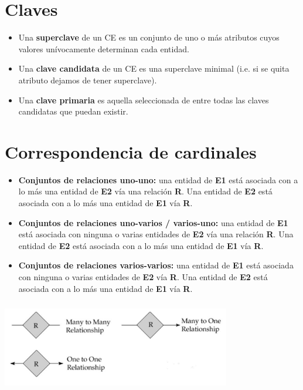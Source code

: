 \documentclass[12pt,a4paper]{report}
\begin{document}
	\section{Claves}
		\begin{itemize}
			\item Una \textbf{superclave} de un CE es un conjunto de uno o más atributos cuyos valores unívocamente determinan cada entidad.
			\item Una \textbf{clave candidata} de un CE es una superclave minimal (i.e. si se quita atributo dejamos de tener superclave).
			\item Una \textbf{clave primaria} es aquella seleccionada de entre todas las claves candidatas que puedan existir.
		\end{itemize}
		
	\section{Correspondencia de cardinales}
		\begin{itemize}
			\item \textbf{Conjuntos de relaciones uno-uno:} una entidad de \textbf{E1} está asociada con a lo más una entidad de \textbf{E2} vía una relación \textbf{R}. Una entidad de \textbf{E2} está asociada con a lo más una entidad de \textbf{E1} vía \textbf{R}.
			\item \textbf{Conjuntos de relaciones uno-varios / varios-uno:} una entidad de \textbf{E1} está asociada con ninguna o varias entidades de \textbf{E2} vía una relación \textbf{R}. Una entidad de \textbf{E2} está asociada con a lo más una entidad de \textbf{E1} vía \textbf{R}.
			\item \textbf{Conjuntos de relaciones varios-varios:} una entidad de \textbf{E1} está asociada con ninguna o varias entidades de \textbf{E2} vía \textbf{R}. Una entidad de \textbf{E2} está asociada con a lo más una entidad de \textbf{E1} vía \textbf{R}.
		\end{itemize}
		
		\begin{center}
			\includegraphics[width=10cm, height=4cm]{./imagenes/correspondencia.png}
		\end{center}
		
\end{document}
